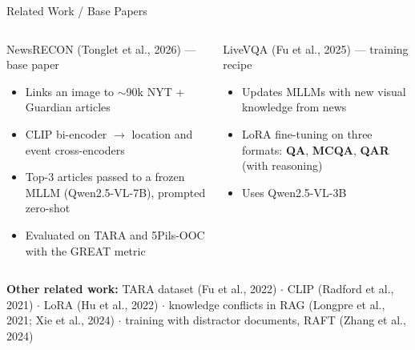 \documentclass[aspectratio=169,10pt]{beamer}
\begin{document}
\begin{frame}{Related Work / Base Papers}
\begin{columns}[T]
\begin{block}{NewsRECON (Tonglet et al., 2026) --- base paper}
\small
\begin{itemize}
\item Links an image to $\sim$90k NYT + Guardian articles
\item CLIP bi-encoder $\rightarrow$ location and event cross-encoders
\item Top-3 articles passed to a \alert{frozen} MLLM (Qwen2.5-VL-7B), prompted zero-shot
\item Evaluated on TARA and 5Pils-OOC with the GREAT metric
\end{itemize}
\end{block}
\begin{block}{LiveVQA (Fu et al., 2025) --- training recipe}
\small
\begin{itemize}
\item Updates MLLMs with new visual knowledge from news
\item LoRA fine-tuning on three formats: \textbf{QA}, \textbf{MCQA}, \textbf{QAR} (with reasoning)
\item Uses Qwen2.5-VL-3B
\end{itemize}
\end{block}
\end{columns}
\vspace{0.5em}
\small
\textbf{Other related work:} TARA dataset (Fu et al., 2022) $\cdot$ CLIP (Radford et al., 2021) $\cdot$ LoRA (Hu et al., 2022) $\cdot$ knowledge conflicts in RAG (Longpre et al., 2021; Xie et al., 2024) $\cdot$ training with distractor documents, RAFT (Zhang et al., 2024)
\end{frame}
\end{document}
